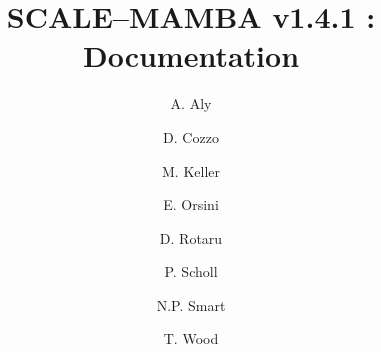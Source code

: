 \documentclass{article}
\begin{document}
\newcommand{\mainsection}[1]{\newpage \section{#1}}
\newcommand{\msubsection}[1]{\newpage \subsection{#1}}
\newcommand{\msubsubsection}[1]{\subsubsection{#1}}

\title{SCALE--MAMBA v1.4.1 : Documentation}
\author{
A. Aly
\and D. Cozzo
\and M. Keller 
\and E. Orsini
\and D. Rotaru 
\and P. Scholl 
\and N.P. Smart
\and T. Wood}

\maketitle

\tableofcontents























\end{document}
